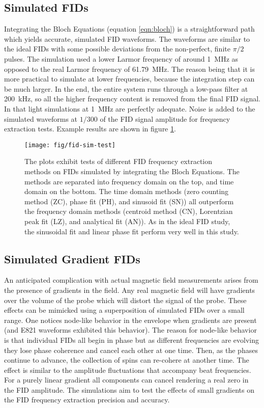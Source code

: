 \subsection{Simulated FIDs}
Integrating the Bloch Equations (equation \ref{eqn:bloch}) is a straightforward path which yields accurate, simulated FID waveforms.  The waveforms are similar to the ideal FIDs with some possible deviations from the non-perfect, finite $\pi/2$ pulses.  The simulation used a lower Larmor frequency of around \SI{1}{\MHz} as opposed to the real Larmor frequency of \SI{61.79}{\MHz}.  The reason being that it is more practical to simulate at lower frequencies, because the integration step can be much larger.  In the end, the entire system runs through a low-pass filter at \SI{200}{\kHz}, so all the higher frequency content is removed from the final FID signal.  In that light simulations at \SI{1}{\MHz} are perfectly adequate.  Noise is added to the simulated waveforms at $1/300$ of the FID signal amplitude for frequency extraction tests.  Example results are shown in figure \ref{fig:fid-sim-freq-extraction}.

\begin{figure}
\centering
\texttt{[image: fig/fid-sim-test]}
\caption{
    The plots exhibit tests of different FID frequency extraction methods on FIDs simulated by integrating the Bloch Equations.  The methods are separated into frequency domain on the top, and time domain on the bottom.  The time domain methods (zero counting method (ZC), phase fit (PH), and sinusoid fit (SN)) all outperform the frequency domain methods (centroid method (CN), Lorentzian peak fit (LZ), and analytical fit (AN)).  As in the ideal FID study, the sinusoidal fit and linear phase fit perform very well in this study.
    \label{fig:fid-sim-freq-extraction}
}
\end{figure}

\subsection{Simulated Gradient FIDs}
An anticipated complication with actual magnetic field measurements arises from the presence of gradients in the field.  Any real magnetic field will have gradients over the volume of the probe which will distort the signal of the probe.  These effects can be mimicked using a superposition of simulated FIDs over a small range.  One notices node-like behavior in the envelope when gradients are present (and E821 waveforms exhibited this behavior).  The reason for node-like behavior is that individual FIDs all begin in phase but as different frequencies are evolving they lose phase coherence and cancel each other at one time.  Then, as the phases continue to advance, the collection of spins can re-cohere at another time.  The effect is similar to the amplitude fluctuations that accompany beat frequencies.  For a purely linear gradient all components can cancel rendering a real zero in the FID amplitude.  The simulations aim to test the effects of small gradients on the FID frequency extraction precision and accuracy.

